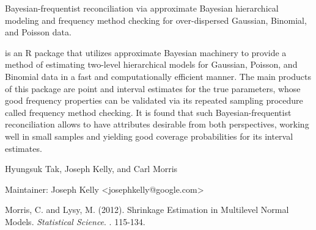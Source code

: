 \documentclass[a4paper]{book}
\begin{document}
%
\begin{Description}\relax
Bayesian-frequentist reconciliation via approximate Bayesian hierarchical modeling and frequency method checking for over-dispersed Gaussian, Binomial, and Poisson data.
\end{Description}
%
\begin{Details}\relax


 is an R package that utilizes approximate Bayesian machinery to provide a method of estimating two-level hierarchical models for Gaussian, Poisson, and Binomial data in a fast and computationally efficient manner. The main products of this package are point and interval estimates for the true parameters, whose good frequency properties can be validated via its repeated sampling procedure called frequency method checking.  It is found that such Bayesian-frequentist reconciliation allows  to have attributes desirable from both perspectives, working well in small samples and yielding good coverage probabilities for its interval estimates.
\end{Details}
%
\begin{Author}\relax
Hyungsuk Tak, Joseph Kelly, and Carl Morris

Maintainer: Joseph Kelly <josephkelly@google.com>
\end{Author}
%
\begin{References}\relax
Morris, C. and Lysy, M. (2012). Shrinkage Estimation in Multilevel Normal Models. \emph{Statistical Science}. . 115-134.
\end{References}
%
\end{document}
